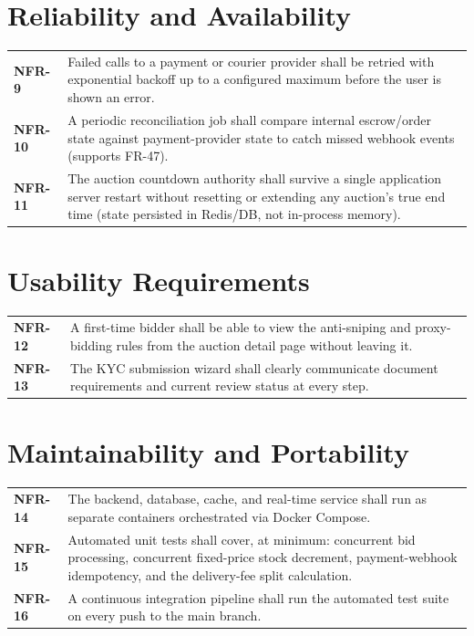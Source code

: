 \documentclass[11pt,a4paper]{report}
\newenvironment{reqtable}{\begin{longtable}{p{2.2cm}p{11.5cm}}}{\end{longtable}}
\begin{document}
\section{Reliability and Availability}
\begin{reqtable}
\textbf{NFR-9} & Failed calls to a payment or courier provider shall be retried with exponential backoff up to a configured maximum before the user is shown an error. \\
\textbf{NFR-10} & A periodic reconciliation job shall compare internal escrow/order state against payment-provider state to catch missed webhook events (supports FR-47). \\
\textbf{NFR-11} & The auction countdown authority shall survive a single application server restart without resetting or extending any auction's true end time (state persisted in Redis/DB, not in-process memory). \\
\end{reqtable}

\section{Usability Requirements}
\begin{reqtable}
\textbf{NFR-12} & A first-time bidder shall be able to view the anti-sniping and proxy-bidding rules from the auction detail page without leaving it. \\
\textbf{NFR-13} & The KYC submission wizard shall clearly communicate document requirements and current review status at every step. \\
\end{reqtable}

\section{Maintainability and Portability}
\begin{reqtable}
\textbf{NFR-14} & The backend, database, cache, and real-time service shall run as separate containers orchestrated via Docker Compose. \\
\textbf{NFR-15} & Automated unit tests shall cover, at minimum: concurrent bid processing, concurrent fixed-price stock decrement, payment-webhook idempotency, and the delivery-fee split calculation. \\
\textbf{NFR-16} & A continuous integration pipeline shall run the automated test suite on every push to the main branch. \\
\end{reqtable}
\end{document}

